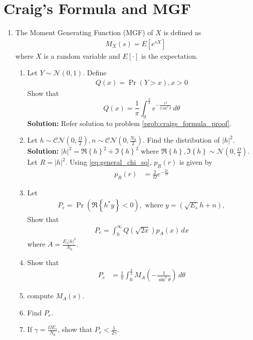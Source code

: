 \documentclass[journal,8pt,onecolumn]{IEEEtran}
\providecommand{\pr}[1]{\ensuremath{\Pr\left(#1\right)}}
\providecommand{\qfunc}[1]{\ensuremath{Q\left(#1\right)}}
\providecommand{\sbrak}[1]{\ensuremath{{}\left[#1\right]}}
\providecommand{\brak}[1]{\ensuremath{\left(#1\right)}}
\providecommand{\cbrak}[1]{\ensuremath{\left\{#1\right\}}}
\providecommand{\abs}[1]{\left\vert#1\right\vert}
\newcommand{\solution}{\noindent \textbf{Solution: }}
\providecommand{\gauss}[2]{\mathcal{N}\ensuremath{\left(#1,#2\right)}}
\begin{document}
\section{Craig's Formula and MGF}
\begin{enumerate}
\item
The Moment Generating Function (MGF) of $X$ is defined as
%
\begin{align}
M_{X}(s) = E\sbrak{e^{s X}}
\end{align}
%
where $X$ is a random variable and $E\sbrak{\cdot}$ is the expectation.  
%
%
\begin{enumerate}[label=(\alph{enumii})]
\item Let $Y \sim \gauss{0}{1}$.  Define
%
\begin{align}
Q(x) = \pr{Y > x}, x > 0
\end{align}
%
Show that
\begin{equation}
Q(x) = \frac{1}{\pi}\int^{\frac{\pi}{2}}_{0}e^{-\frac{x^2}{2\sin^2 \theta}}\,d\theta
\end{equation}
\solution Refer solution to problem \ref{prob:craigs_formula_proof}.
\item 
Let $h\sim\mathcal{CN}\brak{0,\frac{\Omega}{2}},n\sim\mathcal{CN}\brak{0,\frac{N_0}{2}}$.  Find the distribution of $\abs{h}^2$.\\
\solution $\abs{h}^2 = \Re\cbrak{h}^2 + \Im\cbrak{h}^2$ where $\Re\cbrak{h}, \Im\cbrak{h} \sim \gauss{0}{\frac{\Omega}{4}}$. Let $R=\abs{h}^2$. %
Using \eqref{eq:general_chi_sq}, $p_R\brak{r}$ is given by
\begin{align}
	p_{R}\brak{r} &= \frac{2}{\Omega}e^{-\frac{2r}{\Omega}}
\end{align}
\item Let
%
\begin{align}
P_e = \pr{\Re \cbrak{h^*y} < 0}, \text{ where } y = \brak{\sqrt{E_s}h + n},
\end{align}
%
Show that
%
\begin{align}
P_e = \int_{0}^{\infty}\qfunc{\sqrt{2x}}p_{A}(x) \,dx
\end{align}
where $A = \frac{E_s\abs{h}^2}{N_0}$.
\item Show that
%
\begin{align}
P_e 
&=  \frac{1}{\pi}\int_{0}^{\frac{\pi}{2}}M_{A}\brak{-\frac{1}{\sin^2\theta}}\,d\theta
\label{ch4_pe_mgf}
\end{align}
%
\item compute $M_A(s)$.
%
\item 
Find $P_e$.
\item 
If $\gamma = \frac{\Omega E_s}{N_0}$, show that $P_e < \frac{1}{2\gamma}$. 
\end{enumerate}
\end{enumerate}
%
\end{document}
